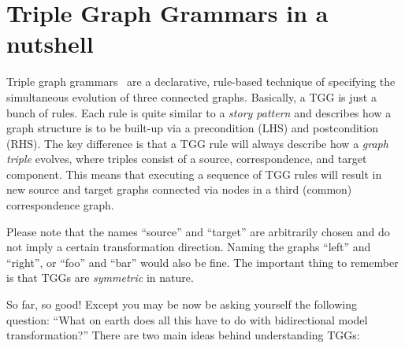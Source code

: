 \section{Triple Graph Grammars in a nutshell}
\label{sec:nutshell}
\genHeader

Triple graph grammars~\cite{tgg:schuerr_94,sk2008,Klar2010} are a declarative, rule-based technique of specifying the simultaneous evolution of three connected
graphs. Basically, a TGG is just a bunch of rules. Each rule is quite similar to a \emph{story pattern} and describes how a graph structure is to be built-up
via a precondition (LHS) and postcondition (RHS). The key difference is that a TGG rule will always describe how a \emph{graph triple}
evolves, where triples consist of a source, correspondence, and target component. This means that executing a sequence of TGG rules will result in new source
and target graphs connected via nodes in a third (common) correspondence graph.

\vspace{0.25cm}

Please note that the names ``source'' and ``target'' are arbitrarily chosen and do not imply a certain transformation direction. Naming the graphs ``left'' and
``right'', or ``foo'' and ``bar'' would also be fine. The important thing to remember is that TGGs are \emph{symmetric} in nature.

\vspace{0.25cm}

So far, so good! Except you may be now be asking yourself the following question: ``What on earth does all this have to do with bidirectional model
transformation?'' There are two main ideas behind understanding TGGs:

